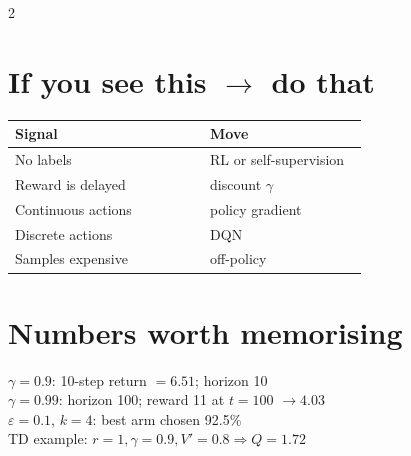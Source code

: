 \documentclass[11pt,a4paper]{article}
\newcommand{\sect}[1]{\section*{#1}}
\begin{document}
\begin{multicols}{2}
\sect{If you see this $\rightarrow$ do that}
\begin{tabular}{@{}p{0.52\linewidth}p{0.42\linewidth}@{}}
\toprule
Signal & Move\\
\midrule
No labels & RL or self-supervision\\
Reward is delayed & discount $γ$\\
Continuous actions & policy gradient\\
Discrete actions & DQN\\
Samples expensive & off-policy\\
\bottomrule
\end{tabular}


\sect{Numbers worth memorising}
$\gamma{=}0.9$: 10-step return $=6.51$; horizon 10\\
$\gamma{=}0.99$: horizon 100; reward 11 at $t{=}100$ $\to 4.03$\\
$\varepsilon{=}0.1$, $k{=}4$: best arm chosen 92.5\%\\
TD example: $r{=}1,\gamma{=}0.9,V'{=}0.8\Rightarrow Q{=}1.72$

\end{multicols}
\end{document}
